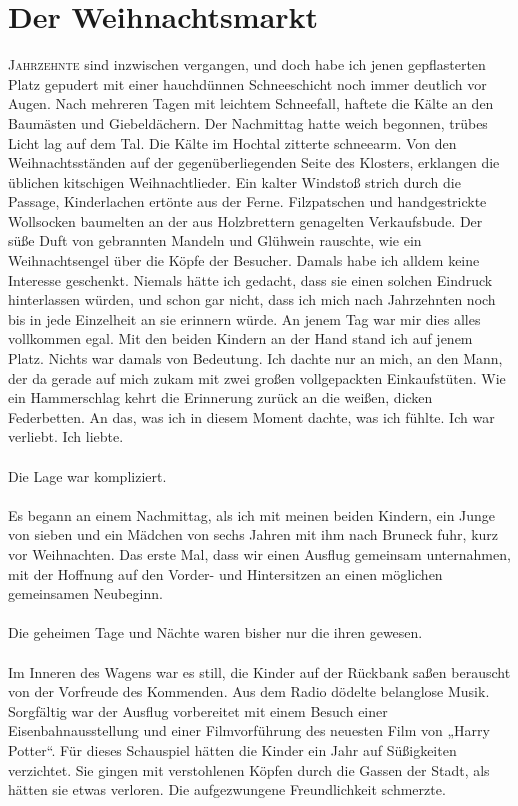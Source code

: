 \chapter{Der Weihnachtsmarkt}
\lettrine{J}{ahrzehnte} sind inzwischen vergangen, und doch habe ich jenen gepflasterten Platz gepudert mit einer hauchdünnen Schneeschicht noch immer deutlich vor Augen. Nach mehreren Tagen mit leichtem Schneefall, haftete die Kälte an den Baumästen und Giebeldächern. Der Nachmittag hatte weich begonnen, trübes Licht lag auf dem Tal. Die Kälte im Hochtal zitterte schneearm. Von den  Weihnachtsständen auf der gegenüberliegenden Seite des Klosters, erklangen die üblichen kitschigen Weihnachtlieder. Ein kalter Windstoß strich durch die Passage, Kinderlachen ertönte aus der Ferne. Filzpatschen und handgestrickte Wollsocken baumelten an der aus Holzbrettern genagelten Verkaufsbude. Der süße Duft von gebrannten Mandeln und Glühwein rauschte, wie ein Weihnachtsengel über die Köpfe der Besucher. Damals habe ich alldem keine Interesse geschenkt. Niemals hätte ich gedacht, dass sie einen solchen Eindruck hinterlassen würden, und schon gar nicht, dass ich mich nach Jahrzehnten noch bis in jede Einzelheit an sie erinnern würde. An jenem Tag war mir dies alles vollkommen egal. Mit den beiden Kindern an der Hand stand ich auf jenem Platz. Nichts war damals von Bedeutung. Ich dachte nur an mich, an den Mann, der da gerade auf mich zukam mit zwei großen vollgepackten Einkaufstüten. Wie ein Hammerschlag kehrt die Erinnerung zurück an die weißen, dicken Federbetten. An das, was ich in diesem Moment dachte, was ich fühlte. Ich war verliebt. Ich liebte. \\\\
Die Lage war kompliziert. \\\\
Es begann an einem Nachmittag, als ich mit meinen beiden Kindern, ein Junge von sieben und ein Mädchen von sechs Jahren mit ihm nach Bruneck fuhr, kurz vor Weihnachten. Das erste Mal, dass wir einen Ausflug gemeinsam unternahmen, mit der Hoffnung auf den Vorder- und Hintersitzen an einen möglichen gemeinsamen Neubeginn. \\\\
Die geheimen Tage und Nächte waren bisher nur die ihren gewesen.\\\\ 
Im Inneren des Wagens war es still, die Kinder auf der Rückbank saßen berauscht von der Vorfreude des Kommenden. Aus dem Radio dödelte belanglose Musik. Sorgfältig war der Ausflug vorbereitet mit einem Besuch einer Eisenbahnausstellung und einer Filmvorführung des neuesten Film von „Harry Potter“. Für dieses Schauspiel hätten die Kinder ein Jahr auf Süßigkeiten verzichtet. Sie gingen mit verstohlenen Köpfen durch die Gassen der Stadt, als hätten sie etwas verloren. Die aufgezwungene Freundlichkeit schmerzte. \\\\

